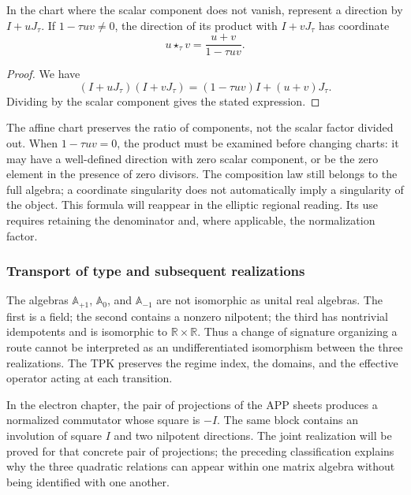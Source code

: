 \begin{proposition}
\label{trit-ampl-prop-pendientes}
In the chart where the scalar component does not vanish, represent a
direction by \(I+uJ_\tau\). If \(1-\tau uv\ne0\), the direction of its
product with \(I+vJ_\tau\) has coordinate
\[
 u\star_\tau v=\frac{u+v}{1-\tau uv}.
\]
\end{proposition}
\begin{proof}
We have
\[
 (I+uJ_\tau)(I+vJ_\tau)
   =(1-\tau uv)I+(u+v)J_\tau.
\]
Dividing by the scalar component gives the stated expression.
\end{proof}

The affine chart preserves the ratio of components, not the scalar factor
divided out. When \(1-\tau uv=0\), the product must be examined before
changing charts: it may have a well-defined direction with zero scalar
component, or be the zero element in the presence of zero divisors.
The composition law still belongs to the full algebra; a coordinate
singularity does not automatically imply a singularity of the object.
This formula will reappear in the elliptic regional reading. Its use
requires retaining the denominator and, where applicable, the normalization factor.

\subsubsection{Transport of type and subsequent realizations}
\label{trit-ampl-puentes}

The algebras \(\mathbb A_{+1}\), \(\mathbb A_0\), and
\(\mathbb A_{-1}\) are not isomorphic as unital real algebras.
The first is a field; the second contains a nonzero nilpotent; the
third has nontrivial idempotents and is isomorphic to
\(\mathbb R\times\mathbb R\). Thus a change of signature organizing a
route cannot be interpreted as an undifferentiated isomorphism between
the three realizations. The TPK preserves the regime index, the domains,
and the effective operator acting at each transition.

In the electron chapter, the pair of projections of the APP sheets
produces a normalized commutator whose square is \(-I\). The same block
contains an involution of square \(I\) and two nilpotent directions.
The joint realization will be proved for that concrete pair of projections;
the preceding classification explains why the three quadratic relations
can appear within one matrix algebra without being identified with one another.

